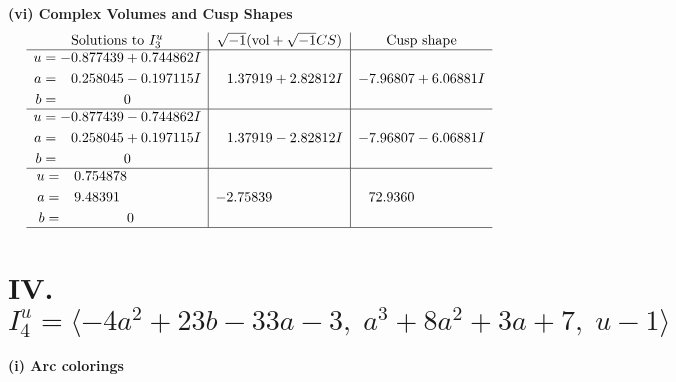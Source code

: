 \documentclass[1p]{elsarticle_modified}
\theoremstyle{definition}
\newcommand{\I}{\sqrt{-1}}
\begin{document}
\newpage\flushleft \textbf{(vi) Complex Volumes and Cusp Shapes}
$$\begin{array}{c|c|c}  
\text{Solutions to }I^u_{3}& \I (\text{vol} + \sqrt{-1}CS) & \text{Cusp shape}\\
 \hline 
\begin{aligned}
u &= -0.877439 + 0.744862 I \\
a &= \phantom{-}0.258045 - 0.197115 I \\
b &= \phantom{-0.000000 } 0\end{aligned}
 & \phantom{-}1.37919 + 2.82812 I & -7.96807 + 6.06881 I \\ \hline\begin{aligned}
u &= -0.877439 - 0.744862 I \\
a &= \phantom{-}0.258045 + 0.197115 I \\
b &= \phantom{-0.000000 } 0\end{aligned}
 & \phantom{-}1.37919 - 2.82812 I & -7.96807 - 6.06881 I \\ \hline\begin{aligned}
u &= \phantom{-}0.754878\phantom{ +0.000000I} \\
a &= \phantom{-}9.48391\phantom{ +0.000000I} \\
b &= \phantom{-0.000000 } 0\end{aligned}
 & -2.75839\phantom{ +0.000000I} & \phantom{-}72.9360\phantom{ +0.000000I}\\
 \hline 
 \end{array}$$\newpage\newpage\renewcommand{\arraystretch}{1}
\centering \section*{IV. $I^u_{4}= \langle -4 a^2+23 b-33 a-3,\;a^3+8 a^2+3 a+7,\;u-1 \rangle$}
\flushleft \textbf{(i) Arc colorings}\\
\end{document}
